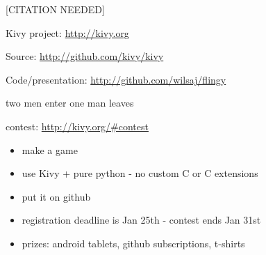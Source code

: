 \documentclass{beamer}
\begin{document}
\begin{frame}{[CITATION NEEDED]}

Kivy project:  \url{http://kivy.org}

Source: \url{http://github.com/kivy/kivy}

Code/presentation: \url{http://github.com/wilsaj/flingy}

\end{frame}


\begin{frame}{two men enter one man leaves}

contest: \url{http://kivy.org/\#contest}

\begin{itemize}
  \item make a game
  \item use Kivy + pure python - no custom C or C extensions
  \item put it on github
  \item registration deadline is Jan 25th - contest ends Jan 31st
  \item prizes: android tablets, github subscriptions, t-shirts
\end{itemize}
\end{frame}
\end{document}
